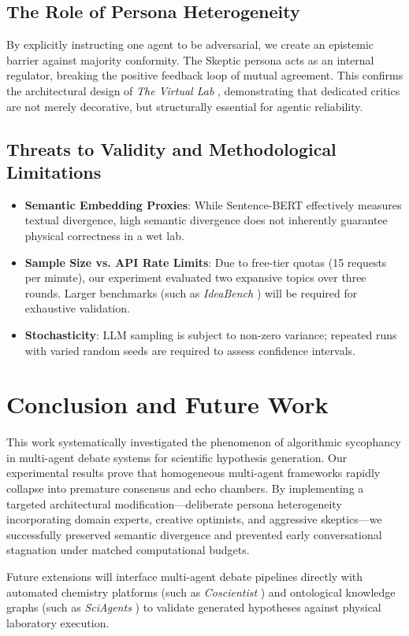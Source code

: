 \documentclass[conference,onecolumn]{IEEEtran}
\begin{document}
\subsection{The Role of Persona Heterogeneity}
By explicitly instructing one agent to be adversarial, we create an epistemic barrier against majority conformity. The Skeptic persona acts as an internal regulator, breaking the positive feedback loop of mutual agreement. This confirms the architectural design of \textit{The Virtual Lab} \cite{swanson2025virtual}, demonstrating that dedicated critics are not merely decorative, but structurally essential for agentic reliability.

\subsection{Threats to Validity and Methodological Limitations}
\begin{itemize}
    \item \textbf{Semantic Embedding Proxies}: While Sentence-BERT effectively measures textual divergence, high semantic divergence does not inherently guarantee physical correctness in a wet lab.
    \item \textbf{Sample Size vs. API Rate Limits}: Due to free-tier quotas (15 requests per minute), our experiment evaluated two expansive topics over three rounds. Larger benchmarks (such as \textit{IdeaBench} \cite{guo2024ideabench}) will be required for exhaustive validation.
    \item \textbf{Stochasticity}: LLM sampling is subject to non-zero variance; repeated runs with varied random seeds are required to assess confidence intervals.
\end{itemize}

\section{Conclusion and Future Work}
This work systematically investigated the phenomenon of algorithmic sycophancy in multi-agent debate systems for scientific hypothesis generation. Our experimental results prove that homogeneous multi-agent frameworks rapidly collapse into premature consensus and echo chambers. By implementing a targeted architectural modification—deliberate persona heterogeneity incorporating domain experts, creative optimists, and aggressive skeptics—we successfully preserved semantic divergence and prevented early conversational stagnation under matched computational budgets. 

Future extensions will interface multi-agent debate pipelines directly with automated chemistry platforms (such as \textit{Coscientist} \cite{boiko2023autonomous}) and ontological knowledge graphs (such as \textit{SciAgents} \cite{ghafarollahi2025sciagents}) to validate generated hypotheses against physical laboratory execution.



\end{document}
